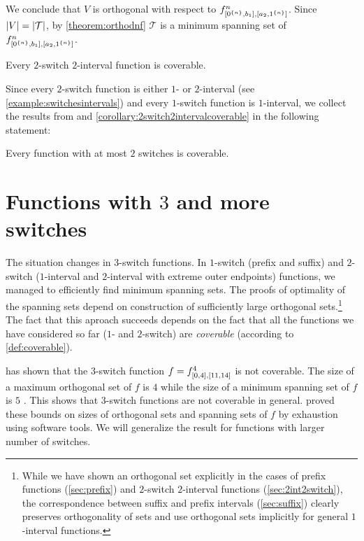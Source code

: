 We conclude that $V$ is orthogonal
with respect to $f^{n}_{[0^{\{n\}}, b_1], [a_2, 1^{\{n\}}]}$.
Since $\lvert V\rvert = \lvert\mathcal{T}\rvert$,
by \cref{theorem:orthodnf} $\mathcal{T}$
is a minimum spanning set of $f^{n}_{[0^{\{n\}}, b_1], [a_2, 1^{\{n\}}]}$.

\begin{corollary}
\label{corollary:2switch2intervalcoverable}
Every $2$-switch $2$-interval function is coverable.
\end{corollary}

Since every $2$-switch function is either $1$- or $2$-interval (see \cref{example:switchesintervals})
and every $1$-switch function is $1$-interval,
we collect the results from 
and \cref{corollary:2switch2intervalcoverable}
in the following statement:
\begin{corollary}
Every function with at most $2$ switches is coverable.
\end{corollary}

\section{Functions with \texorpdfstring{$3$}{3}
and more switches}
\label{sec:3switch}

The situation changes in $3$-switch functions.
In $1$-switch (prefix and suffix)
and $2$-switch ($1$-interval and $2$-interval
with extreme outer endpoints)
functions,
we managed to efficiently find minimum spanning sets.
The proofs of optimality of the spanning sets
depend on construction of sufficiently large
orthogonal sets.\footnote{While we have shown
an orthogonal set explicitly
in the cases of prefix functions (\cref{sec:prefix})
and $2$-switch $2$-interval functions (\cref{sec:2int2switch}),
the correspondence between suffix and prefix intervals
(\cref{sec:suffix})
clearly preserves orthogonality of sets
and \citet{Schieber2005154}
use orthogonal sets implicitly
for general $1$-interval functions.}
The fact that this aproach succeeds
depends on the fact that all the functions we have considered so far ($1$- and $2$-switch)
are \emph{coverable}
(according to \cref{def:coverable}).

\citeauthor{Dubovsky2012} has shown that
the $3$-switch function
$f = f^{4}_{[0, 4], [11, 14]}$ is not coverable.
The size of a maximum orthogonal set of $f$ is $4$
while the size of a minimum spanning set of $f$ is $5$
\citep[p.~32]{Dubovsky2012}.
This shows that $3$-switch functions are not coverable in general.
\citeauthor{Dubovsky2012} proved these bounds
on sizes of orthogonal sets and spanning sets of $f$
by exhaustion using software tools.
We will generalize the result for functions
with larger number of switches.

